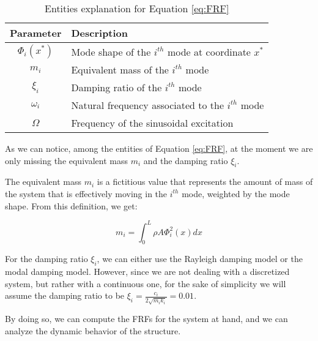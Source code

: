 \begin{table}[H]
    \centering
    \begin{tabular}{cl}
        \hline
        Parameter     & Description                                         \\
        \hline
        $\Phi_i(x^*)$ & Mode shape of the $i^{th}$ mode at coordinate $x^*$ \\
        $m_i$         & Equivalent mass of the $i^{th}$ mode                \\
        $\xi_i$       & Damping ratio of the $i^{th}$ mode                  \\
        $\omega_i$    & Natural frequency associated to the $i^{th}$ mode   \\
        $\Omega$      & Frequency of the sinusoidal excitation              \\
        \hline
    \end{tabular}
    \caption{Entities explanation for Equation \ref{eq:FRF}}
    \label{tab:FRF_entities}
\end{table}

As we can notice, among the entities of Equation \ref{eq:FRF}, at the moment we are only missing the equivalent mass $m_i$ and the damping ratio $\xi_i$.

The equivalent mass $m_i$ is a fictitious value that represents the amount of mass of the system that is effectively moving in the $i^{th}$ mode, weighted by the mode shape.
From this definition, we get:

\begin{equation}
    m_i = \int_{0}^{L} \rho A \Phi_i^2(x) dx
\end{equation}

For the damping ratio $\xi_i$, we can either use the Rayleigh damping model or the modal damping model.
However, since we are not dealing with a discretized system, but rather with a continuous one, for the sake of simplicity we will assume the damping ratio to be $\xi_i = \frac{c_i}{2 \sqrt{m_i k_i}} = 0.01$.

By doing so, we can compute the FRFs for the system at hand, and we can analyze the dynamic behavior of the structure.


